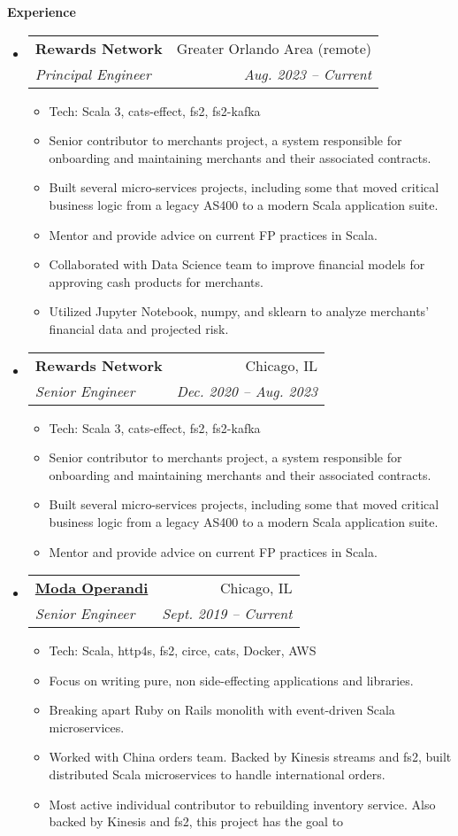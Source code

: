 \documentclass[letterpaper,11pt]{article}
\makeatletter
\newcommand{\resitem}[1]{\item #1 \vspace{-2pt}}
\newcommand{\resheading}[1]{{\large \colorbox{mygrey}{\begin{minipage}{\textwidth}{\textbf{#1 \vphantom{p\^{E}}}}\end{minipage}}}}
\newcommand{\ressubheading}[4]{
\begin{tabular*}{6.5in}{l@{\extracolsep{\fill}}r}
		\textbf{#1} & #2 \\
		\textit{#3} & \textit{#4} \\
\end{tabular*}\vspace{-6pt}}
\makeatother
\begin{document}
\resheading{Experience}
\begin{itemize}
\item
\ressubheading{Rewards Network}{Greater Orlando Area (remote)}{Principal Engineer}{Aug. 2023 -- Current}
    { \footnotesize
    \begin{itemize}
        \resitem{Tech: Scala 3, cats-effect, fs2, fs2-kafka}
        \resitem{Senior contributor to merchants project, a system responsible for onboarding and maintaining merchants and their associated contracts.}
        \resitem{Built several micro-services projects, including some that moved critical business logic from a legacy AS400 to a modern Scala application suite.}
        \resitem{Mentor and provide advice on current FP practices in Scala.}
        \resitem{Collaborated with Data Science team to improve financial models for approving cash products for merchants.}
        \resitem{Utilized Jupyter Notebook, numpy, and sklearn to analyze merchants' financial data and projected risk.}
    \end{itemize}
    }
\item
\ressubheading{Rewards Network}{Chicago, IL}{Senior Engineer}{Dec. 2020 -- Aug. 2023}
    { \footnotesize
    \begin{itemize}
        \resitem{Tech: Scala 3, cats-effect, fs2, fs2-kafka}
        \resitem{Senior contributor to merchants project, a system responsible for onboarding and maintaining merchants and their associated contracts.}
        \resitem{Built several micro-services projects, including some that moved critical business logic from a legacy AS400 to a modern Scala application suite.}
        \resitem{Mentor and provide advice on current FP practices in Scala.}
    \end{itemize}
    }
\item
 \ressubheading{\href{http://www.modaoperandi.com/}{Moda Operandi}}{Chicago, IL}{Senior Engineer}{Sept. 2019 -- Current}
   { \footnotesize
   \begin{itemize}
        \resitem{Tech: Scala, http4s, fs2, circe, cats, Docker, AWS}
        \resitem{Focus on writing pure, non side-effecting applications and libraries.}
        \resitem{Breaking apart Ruby on Rails monolith with event-driven Scala microservices.}
        \resitem{Worked with China orders team. Backed by Kinesis streams and fs2, built distributed Scala
        microservices to handle international orders.}
        \resitem{Most active individual contributor to rebuilding inventory
        service. Also backed by Kinesis and fs2, this project has the goal to
}
\end{itemize}}
\end{itemize}
\end{document}
